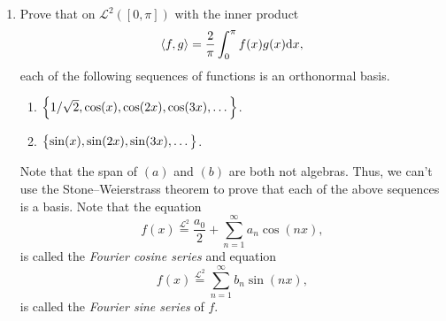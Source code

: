 \documentclass[11pt,a4paper]{article}
\begin{document}
\begin{exercise}
\begin{enumerate}
\[      \]
      where
      \[
        a_n = \frac{2}{\pi} \int_{0}^{\pi} f(x) \cos(nx) \dx
      \]
      and
      \[
        f(x) \overset{\mathcal L^2}{=} \sum_{n=1}^{\infty} b_n \sin(nx),
      \]
      where
      \[
        b_n = \frac{2}{\pi} \int_{0}^{\pi} f(x) \sin(nx) \dx.
      \]
    \item[(5)] Prove that on $\mathcal L^2([0,\pi])$ with the inner product
      \[
        \ip{f}{g} =
        \frac{2}{\pi} \int_{0}^{\pi} f(x) g(x) \dx,
      \]
      each of the following sequences of functions is an orthonormal basis.
      \begin{enumerate}
        \item[(a)] $\left\{1/\sqrt{2},\cos(x),\cos(2x),\cos(3x),\dots\right\}$.
        \item[(b)] $\left\{\sin(x),\sin(2x),\sin(3x),\dots\right\}$.
      \end{enumerate}
      Note that the span of $(a)$ and $(b)$ are both not algebras.
      Thus, we can't use the Stone--Weierstrass theorem to prove that each
      of the above sequences is a basis.
      Note that the equation
      \[
        f(x) \overset{\mathcal L^2}{=} \frac{a_0}{2} + \sum_{n=1}^{\infty} a_n \cos(nx),
      \]
      is called the \textit{Fourier cosine series} and equation
      \[
        f(x) \overset{\mathcal L^2}{=} \sum_{n=1}^{\infty} b_n \sin(nx),
      \]
      is called the \textit{Fourier sine series} of $f$.
  \end{enumerate}
\end{exercise}
\end{document}
